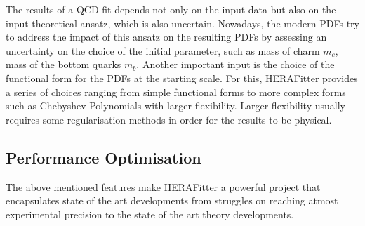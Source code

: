 The results of a QCD fit depends not only on the input data but also on the 
input theoretical ansatz, which is also uncertain. Nowadays, the modern PDFs 
try to address the impact of this ansatz on the resulting PDFs by assessing an 
uncertainty on the choice of the initial parameter, such as mass of charm $m_c$, mass of the bottom quarks $m_b$. Another important input is the choice of the functional form for the PDFs at the starting scale. 
For this, HERAFitter provides a series of choices ranging from simple functional forms to more complex forms such as Chebyshev Polynomials with larger flexibility. Larger flexibility usually requires some regularisation methods in order for the results to be physical.




\subsection{Performance Optimisation}

The above mentioned features make HERAFitter a powerful project that encapsulates state of the art developments from struggles on reaching atmost experimental precision to the state of the art theory developments. 



